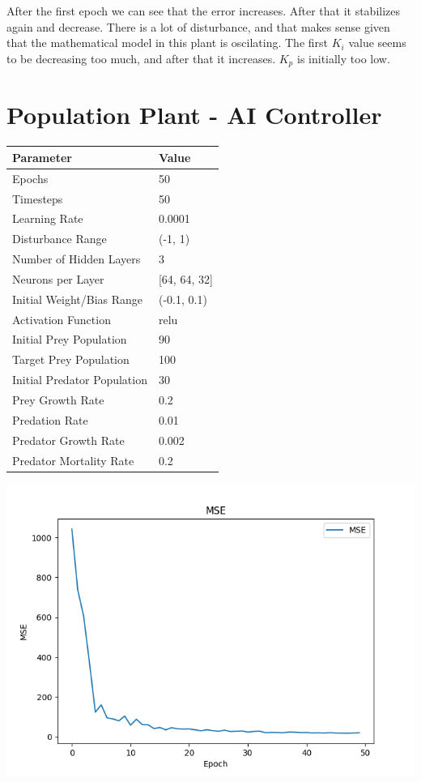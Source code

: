 \documentclass[12pt]{article}
\begin{document}
After the first epoch we can see that the error increases. After that it stabilizes again and decrease. There is a lot
of disturbance, and that makes sense given that the mathematical model in this plant is oscilating. The first $K_i$ value
seems to be decreasing too much, and after that it increases. $K_p$ is initially too low.

\section*{Population Plant - AI Controller}

\begin{tabular}{|l|l|}
    \hline
    \textbf{Parameter}   & \textbf{Value}\\ \hline
    Epochs               & 50            \\ \hline
    Timesteps            & 50            \\ \hline
    Learning Rate        & 0.0001          \\ \hline
    Disturbance Range    & (-1, 1) \\ \hline
    Number of Hidden Layers           & 3           \\ \hline
    Neurons per Layer           & [64, 64, 32]           \\ \hline
    Initial Weight/Bias Range           & (-0.1, 0.1)           \\ \hline
    Activation Function                    & relu            \\ \hline
    Initial Prey Population                    & 90            \\ \hline
    Target Prey Population & 100             \\ \hline
    Initial Predator Population                    & 30           \\ \hline
    Prey Growth Rate & 0.2             \\ \hline
    Predation Rate & 0.01             \\ \hline
    Predator Growth Rate & 0.002             \\ \hline
    Predator Mortality Rate & 0.2             \\ \hline
\end{tabular}

\begin{center}
    \includegraphics[width=0.8\linewidth]{figures/population-ai.png}
\end{center}
\end{document}
